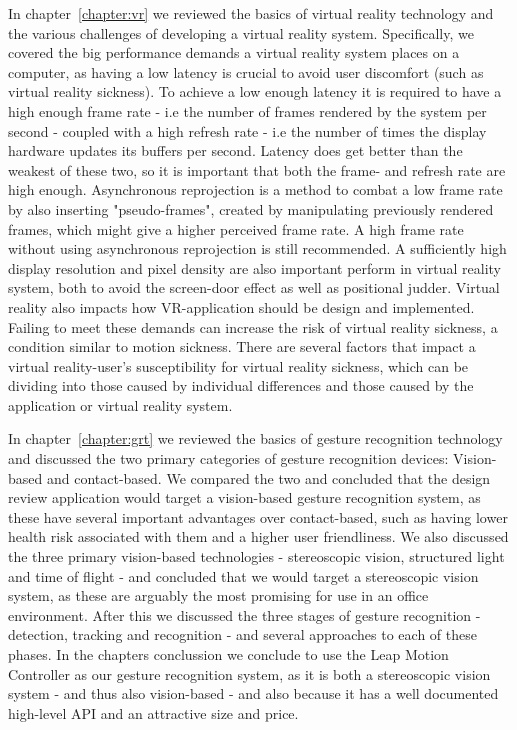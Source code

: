 In chapter~\vref{chapter:vr} we reviewed the basics of virtual reality technology and the various challenges of developing a virtual reality system. 
Specifically, we covered the big performance demands a virtual reality system places on a computer, as having a low latency is crucial to avoid user discomfort (such
as virtual reality sickness). To achieve a low enough latency it is required to have a high enough frame rate - i.e the number of frames rendered by the system per second - 
coupled with a high refresh rate - i.e the number of times the display hardware updates its buffers per second. Latency does get better than the weakest of these two, so it is 
important that both the frame- and refresh rate are high enough. Asynchronous reprojection is a method to combat a low frame rate by also inserting "pseudo-frames", 
created by manipulating previously rendered frames, which might give a higher perceived frame rate. A high frame rate without using asynchronous reprojection is still 
recommended. A sufficiently high display resolution and pixel density are also important perform in virtual reality system, both to avoid the screen-door effect as well
as positional judder. Virtual reality also impacts how VR-application should be design and implemented. Failing to meet these demands can increase the 
risk of virtual reality sickness, a condition similar to motion sickness. There are several factors that impact a virtual reality-user's susceptibility for virtual 
reality sickness, which can be dividing into those caused by individual differences and those caused by the application or virtual reality system. 

In chapter~\vref{chapter:grt} we reviewed the basics of gesture recognition technology and discussed the two primary categories of gesture recognition devices: Vision-based
and contact-based. We compared the two and concluded that the design review application would target a vision-based gesture recognition system, as these have several important
advantages over contact-based, such as having lower health risk associated with them and a higher user friendliness. We also discussed the three primary vision-based 
technologies - stereoscopic vision, structured light and time of flight - and concluded that we would target a stereoscopic vision system, as these are 
arguably the most promising for use in an office environment. After this we discussed the three stages of gesture recognition - detection, tracking and recognition - 
and several approaches to each of these phases. In the chapters conclussion we conclude to use the Leap Motion Controller as our gesture recognition system, 
as it is both a stereoscopic vision system - and thus also vision-based - and also because it has a well documented high-level API and an attractive size and price.

